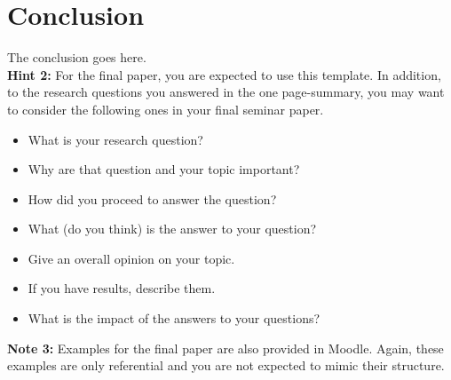 \documentclass[sigconf]{acmart}
\begin{document}
\section{Conclusion}
The conclusion goes here.\\

\textbf{Hint 2:} For the final paper, you are expected to use this template. In addition, to the research questions you answered in the one page-summary, you may want to consider the following ones in your final seminar paper.
  \begin{itemize}
  \item What is your research question?
  \item Why are that question and your topic important?
  \item How did you proceed to answer the question?
  \item What (do you think) is the answer to your question?
  \item Give an overall opinion on your topic.
  \item If you have results, describe them.
  \item What is the impact of the answers to your questions?
  \end{itemize}
  
\textbf{Note 3:} Examples for the final paper are also provided in Moodle. Again, these examples are only referential and you are not expected to mimic their structure. 


\newpage

 
\end{document}

